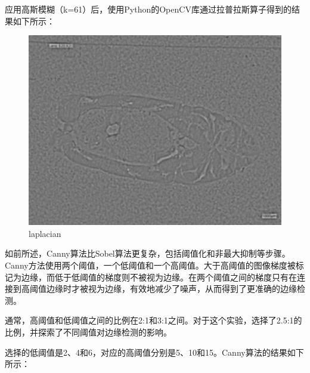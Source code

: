 应用高斯模糊（k=61）后，使用Python的OpenCV库通过拉普拉斯算子得到的结果如下所示：

\begin{figure}[H]
    \centering
    \begin{minipage}{0.4\textwidth}
        \centering
        \includegraphics[width=\textwidth]{./fig/gausssian/laplacian61.jpg}
        \caption{laplacian}
        \label{fig:laplacian}
    \end{minipage}
\end{figure}

如前所述，Canny算法比Sobel算法更复杂，包括阈值化和非最大抑制等步骤。Canny方法使用两个阈值，一个低阈值和一个高阈值。大于高阈值的图像梯度被标记为边缘，而低于低阈值的梯度则不被视为边缘。在两个阈值之间的梯度只有在连接到高阈值边缘时才被视为边缘，有效地减少了噪声，从而得到了更准确的边缘检测。

通常，高阈值和低阈值之间的比例在2:1和3:1之间。对于这个实验，选择了2.5:1的比例，并探索了不同阈值对边缘检测的影响。

选择的低阈值是2、4和6，对应的高阈值分别是5、10和15。Canny算法的结果如下所示：

